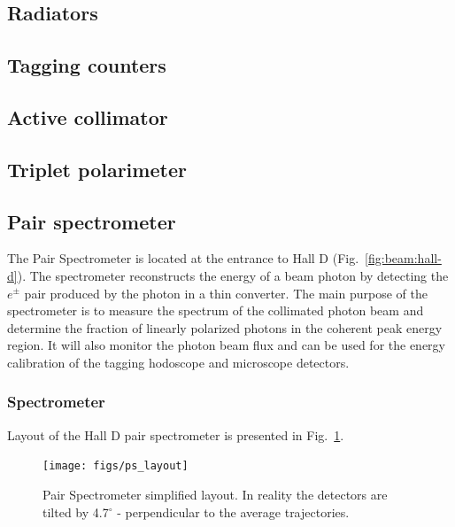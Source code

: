 \subsection{Radiators \label{sec:radiators}}
\subsection{Tagging counters \label{sec:tag}}
\subsection{Active collimator \label{sec:coll}}
\subsection{Triplet polarimeter \label{sec:tpol}}
\subsection[Pair spectrometer (TCR)]{Pair spectrometer \label{sec:ps}}

The Pair Spectrometer is located at the entrance to Hall D
(Fig.~\ref{fig:beam:hall-d}).  The spectrometer reconstructs the
energy of a beam photon by detecting the $e^\pm$ pair produced by the
photon in a thin converter. The main purpose of the spectrometer is to
measure the spectrum of the collimated photon beam and determine the
fraction of linearly polarized photons in the coherent peak energy
region. It will also monitor the photon beam flux and can be used for
the energy calibration of the tagging hodoscope and microscope
detectors.


\subsubsection[Spectrometer]{Spectrometer
  \label{sec:beamline:ps-spetrometer}}

Layout of the Hall D pair spectrometer is presented in Fig.~\ref{fig:beam:ps-layout}. 
\begin{figure}[h]
\begin{center}
   \texttt{[image: figs/ps\_layout]}
\end{center}
\caption{Pair Spectrometer simplified layout. In reality the detectors 
         are tilted by 4.7$^\circ$ - perpendicular to the average
         trajectories.
        }
\label{fig:beam:ps-layout} 
\end{figure}

